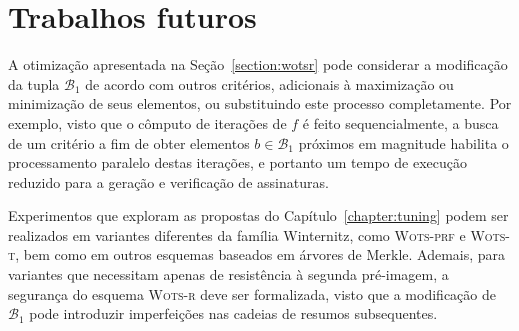 \documentclass[12pt,notitlepage]{report}
\newcommand{\wotsprf}{\textsc{Wots-prf}}
\newcommand{\wotst}{\textsc{Wots-t}}
\newcommand{\wotsr}{\textsc{Wots-r}}
\begin{document}
\section{Trabalhos futuros}
\label{section:future}

A otimização apresentada na Seção~\ref{section:wotsr} pode considerar a modificação da tupla $\mathcal{B}_1$ de acordo com outros critérios, adicionais à maximização ou minimização de seus elementos, ou substituindo este processo completamente. Por exemplo, visto que o cômputo de iterações de $f$ é feito sequencialmente, a busca de um critério a fim de obter elementos $b \in \mathcal{B}_1$ próximos em magnitude habilita o processamento paralelo destas iterações, e portanto um tempo de execução reduzido para a geração e verificação de assinaturas.

Experimentos que exploram as propostas do Capítulo~\ref{chapter:tuning} podem ser realizados em variantes diferentes da família Winternitz, como \wotsprf{} e \wotst{}, bem como em outros esquemas baseados em árvores de Merkle. Ademais, para variantes que necessitam apenas de resistência à segunda pré-imagem, a segurança do esquema \wotsr{} deve ser formalizada, visto que a modificação de $\mathcal{B}_{1}$ pode introduzir imperfeições nas cadeias de resumos subsequentes.



\end{document}
